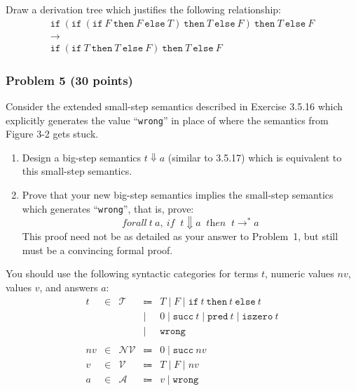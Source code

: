 \documentclass{article}
\begin{document}
Draw a derivation tree which justifies the following relationship:
\begin{gather*} 
  \texttt{if}
   \ (\texttt{if}
     \ (\texttt{if}\ F\ \texttt{then}\ F\ \texttt{else}\ T)
     \ \texttt{then}\ T
     \ \texttt{else}\ F)
   \ \texttt{then}\ T
   \ \texttt{else}\ F 
   \\ \longrightarrow
   \\ 
  \texttt{if}
   \ (\texttt{if}
     \ T
     \ \texttt{then}\ T
     \ \texttt{else}\ F)
   \ \texttt{then}\ T
   \ \texttt{else}\ F 
\end{gather*}

\subsubsection*{Problem 5 (30 points)}

Consider the extended small-step semantics described in Exercise 3.5.16 which
explicitly generates the value ``\texttt{wrong}'' in place of where the
semantics from Figure 3-2 gets stuck.
\begin{enumerate}
\item
  Design a big-step semantics $t \Downarrow a$ (similar to 3.5.17) which is
  equivalent to this small-step semantics.
\item
  Prove that your new big-step semantics implies the small-step semantics which
    generates ``\texttt{wrong}'', that is, prove:
    \[ \textit{forall}\ t\ a,
       \ \textit{if}\;\;t \Downarrow a\;\;\textit{then}\;\;t \longrightarrow^* a 
    \]
    This proof need not be as detailed as your answer to Problem~1, but still
    must be a convincing formal proof.
\end{enumerate}
You should use the following syntactic categories for terms $t$, numeric values
$nv$, values $v$, and answers $a$:
\[ \begin{array}{rcrcl}
     t {}&{} \in {}&{} \mathcal{T} {}&{} \Coloneqq {}&{} T \mid F \mid \texttt{if}\ t\ \texttt{then}\ t\ \texttt{else}\ t
  \\   {}&{}     {}&{}             {}&{} \mid      {}&{} 0 \mid \texttt{succ}\ t \mid \texttt{pred}\ t \mid \texttt{iszero}\ t
  \\   {}&{}     {}&{}             {}&{} \mid      {}&{} \texttt{wrong}
  \\ 
  \\  nv {}&{} \in {}&{} \mathcal{NV} {}&{} \Coloneqq {}&{} 0 \mid \texttt{succ}\ nv
  \\  v  {}&{} \in {}&{} \mathcal{V}  {}&{} \Coloneqq {}&{} T \mid F \mid nv
  \\  a  {}&{} \in {}&{} \mathcal{A}  {}&{} \Coloneqq {}&{} v \mid \texttt{wrong}
  \
   \end{array}
\]
\end{document}
